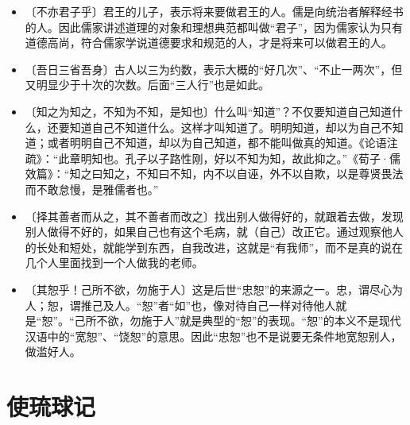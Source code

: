 \documentclass[12pt,UTF-8,openany]{ctexbook}
\begin{document}
\begin{itemize}
    \setlength\itemsep{-0.2em}
    \item〔不亦君子乎〕君王的儿子，表示将来要做君王的人。儒是向统治者解释经书的人。因此儒家讲述道理的对象和理想典范都叫做“君子”，因为儒家认为只有道德高尚，符合儒家学说道德要求和规范的人，才是将来可以做君王的人。
    \item〔吾日三省吾身〕古人以三为约数，表示大概的“好几次”、“不止一两次”，但又明显少于十次的次数。后面“三人行”也是如此。
    \item〔知之为知之，不知为不知，是知也〕什么叫“知道”？不仅要知道自己知道什么，还要知道自己不知道什么。这样才叫知道了。明明知道，却以为自己不知道；或者明明自己不知道，却以为自己知道，都不能叫做真的知道。《论语注疏》：“此章明知也。孔子以子路性刚，好以不知为知，故此抑之。”《荀子·儒效篇》：“知之曰知之，不知曰不知，内不以自诬，外不以自欺，以是尊贤畏法而不敢怠慢，是雅儒者也。”
    \item〔择其善者而从之，其不善者而改之〕找出别人做得好的，就跟着去做，发现别人做得不好的，如果自己也有这个毛病，就（自己）改正它。通过观察他人的长处和短处，就能学到东西，自我改进，这就是“有我师”，而不是真的说在几个人里面找到一个人做我的老师。
    \item〔其恕乎！己所不欲，勿施于人〕这是后世“忠恕”的来源之一。忠，谓尽心为人；恕，谓推己及人。“恕”者“如”也，像对待自己一样对待他人就是“恕”。“己所不欲，勿施于人”就是典型的“恕”的表现。“恕”的本义不是现代汉语中的“宽恕”、“饶恕”的意思。因此“忠恕”也不是说要无条件地宽恕别人，做滥好人。
\end{itemize}

\chapter{使琉球记}
\end{document}
